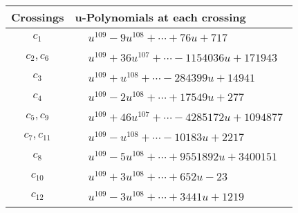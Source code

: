 \documentclass[1p]{elsarticle_modified}
\theoremstyle{definition}
\begin{document}
\begin{tabular}{m{50pt}|m{274pt}}
Crossings & \hspace{64pt}u-Polynomials at each crossing \\
\hline $$\begin{aligned}c_{1}\end{aligned}$$&$\begin{aligned}
&u^{109}-9 u^{108}+\cdots+76 u+717
\end{aligned}$\\
\hline $$\begin{aligned}c_{2},c_{6}\end{aligned}$$&$\begin{aligned}
&u^{109}+36 u^{107}+\cdots-1154036 u+171943
\end{aligned}$\\
\hline $$\begin{aligned}c_{3}\end{aligned}$$&$\begin{aligned}
&u^{109}+u^{108}+\cdots-284399 u+14941
\end{aligned}$\\
\hline $$\begin{aligned}c_{4}\end{aligned}$$&$\begin{aligned}
&u^{109}-2 u^{108}+\cdots+17549 u+277
\end{aligned}$\\
\hline $$\begin{aligned}c_{5},c_{9}\end{aligned}$$&$\begin{aligned}
&u^{109}+46 u^{107}+\cdots-4285172 u+1094877
\end{aligned}$\\
\hline $$\begin{aligned}c_{7},c_{11}\end{aligned}$$&$\begin{aligned}
&u^{109}- u^{108}+\cdots-10183 u+2217
\end{aligned}$\\
\hline $$\begin{aligned}c_{8}\end{aligned}$$&$\begin{aligned}
&u^{109}-5 u^{108}+\cdots+9551892 u+3400151
\end{aligned}$\\
\hline $$\begin{aligned}c_{10}\end{aligned}$$&$\begin{aligned}
&u^{109}+3 u^{108}+\cdots+652 u-23
\end{aligned}$\\
\hline $$\begin{aligned}c_{12}\end{aligned}$$&$\begin{aligned}
&u^{109}-3 u^{108}+\cdots+3441 u+1219
\end{aligned}$\\
\hline
\end{tabular}\\~\\
\end{document}
